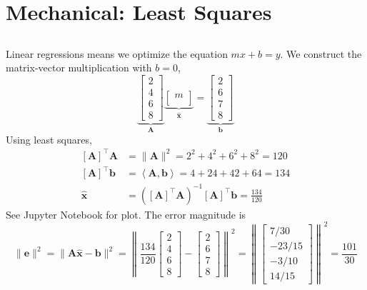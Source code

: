 \documentclass[]{article}
\renewcommand{\vec}[1]{\bm{#1}}
\newcommand{\unit}[1]{\vec{\hat{#1}}}
\newcommand{\iprod}[2]{\left\langle #1, #2 \right\rangle}
\newcommand{\tpose}[1]{\left[#1\right]^{\! \top}}
\begin{document}
\section{Mechanical: Least Squares}

\subsection{}

Linear regressions means we optimize the equation \(mx + b = y\). 
We construct the matrix-vector multiplication with \(b = 0\),
\begin{equation}
	\underbrace{\begin{bmatrix}
	2 \\
	4 \\
	6 \\
	8
	\end{bmatrix}}_{\vec{A}}
	\underbrace{\begin{bmatrix}
	m \\
	\end{bmatrix}}_{\unit{x}}
	=
	\underbrace{\begin{bmatrix}
	2 \\
	6 \\
	7 \\
	8
	\end{bmatrix}}_{\vec{b}}
\end{equation}
Using least squares, 
\begin{align}
	\tpose{\vec{A}} \vec{A} &= \|\vec{A}\|^2 = 2^2 + 4^2 + 6^2 + 8^2 = 120 \\
	\tpose{\vec{A}} \vec{b} &= \iprod{\vec{A}}{\vec{b}} = 4 + 24 + 42 + 64 = 134 \\
	\unit{x} &= (\tpose{\vec{A}} \vec{A})^{-1} \tpose{\vec{A}} \vec{b} = \frac{134}{120}
\end{align}
See Jupyter Notebook for plot. 
The error magnitude is 
\begin{equation}
	\|\vec{e}\|^2 = \|\vec{A} \unit{x} - \vec{b}\|^2 = \left\|\frac{134}{120}\begin{bmatrix}
	2 \\
	4 \\
	6 \\
	8
	\end{bmatrix} - \begin{bmatrix}
	2 \\
	6 \\
	7 \\
	8
	\end{bmatrix}\right\|^2 = \left\|\begin{bmatrix}
	7 / 30 \\
	-23 / 15 \\
	-3 / 10 \\
	14 / 15
	\end{bmatrix}\right\|^2 = \frac{101}{30}
\end{equation}
\end{document}
